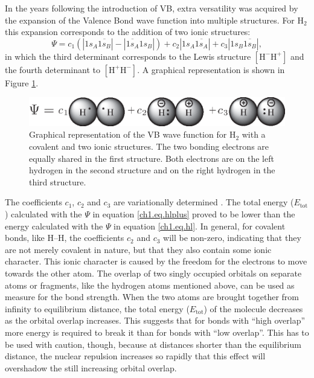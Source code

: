 In the years following the introduction of VB, extra versatility was acquired by the expansion of the Valence Bond wave function into multiple structures. For H$_2$ this expansion corresponds to the addition of two ionic structures:
\begin{equation}
\Psi = c_1 (|1s_{A}\overline{1s_{B}}| - |\overline{1s_{A}}1s_{B}|) + c_2 |1s_{A}\overline{1s_{A}}| + c_3 |1s_{B}\overline{1s_{B}}|,
\label{ch1.eq.hlplus}
\end{equation}
in which the third determinant corresponds to the Lewis structure $\mathrm{[H^{-} H^{+}]}$ and the fourth determinant to $\mathrm{[H^{+} H^{-}]}$. A graphical representation is shown in Figure \ref{ch1.fig.heitlerplus}.
\begin{figure}[htp]
\center
\includegraphics[scale=1]{introduction/figures/heitlerplus.eps}
\caption{Graphical representation of the VB wave function for $\mathrm{H_2}$ with a covalent and two ionic structures. The two bonding electrons are equally shared in the first structure. Both electrons are on the left hydrogen in the second structure and on the right hydrogen in the third structure.}
\label{ch1.fig.heitlerplus}   
\end{figure}
The coefficients $c_1$, $c_2$ and $c_3$ are variationally determined \cite{varia}. The total energy ($E_\mathrm{tot}$) calculated with the $\Psi$ in equation \ref{ch1.eq.hlplus} proved to be lower than the energy calculated with the $\Psi$ in equation \ref{ch1.eq.hl}. In general, for covalent bonds, like H--H, the coefficients $c_2$ and $c_3$ will be non-zero, indicating that they are not merely covalent in nature, but that they also contain some ionic character. This ionic character is caused by the freedom for the electrons to move towards the other atom. The overlap of two singly occupied orbitals on separate atoms or fragments, like the hydrogen atoms mentioned above, can be used as measure for the bond strength. When the two atoms are brought together from infinity to equilibrium distance, the total energy ($E_\mathrm{tot}$) of the molecule decreases as the orbital overlap increases. This suggests that for bonds with ``high overlap'' more energy is required to break it than for bonds with ``low overlap''. This has to be used with caution, though, because at distances shorter than the equilibrium distance, the nuclear repulsion increases so rapidly that this effect will overshadow the still increasing orbital overlap.

